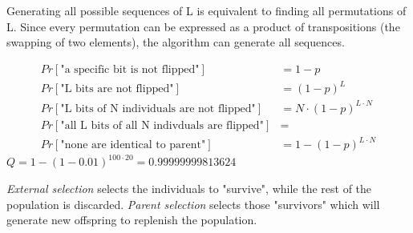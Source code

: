 \documentclass[10pt,a4paper,boxed]{hmcpset}
\begin{document}
\begin{problem}[Assignment 46]
\end{problem}
\begin{solution}
Generating all possible sequences of L is equivalent to finding all permutations of L. Since every permutation can be expressed as a product of transpositions (the swapping of two elements), the algorithm can generate all sequences.
\end{solution}

\begin{problem}[Assignment 47]
\end{problem}
\begin{solution}
\begin{align*}
	Pr[\mbox{"a specific bit is not flipped"}] & = 1-p \\
	Pr[\mbox{"L bits are not flipped"}] & = (1-p)^L \\
	Pr[\mbox{"L bits of N individuals are not flipped"}] & = N \cdot (1-p)^{L \cdot N} \\
	Pr[\mbox{"all L bits of all N indivduals are flipped"}] & = \\
	Pr[\mbox{"none are identical to parent"}] & = 1 - (1-p)^{L \cdot N} 
\end{align*}
$Q = 1-(1-0.01)^{100 \cdot 20} = 0.99999999813624$
\end{solution}

\begin{problem}[Assignment 48]
\end{problem}
\begin{solution}
\emph{External selection} selects the individuals to "survive", while the rest of the population is discarded. \emph{Parent selection} selects those "survivors" which will generate new offspring to replenish the population.
\end{solution}
\end{document}
